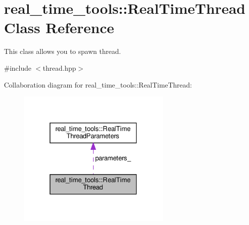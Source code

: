 \hypertarget{classreal__time__tools_1_1RealTimeThread}{}\section{real\+\_\+time\+\_\+tools\+:\+:Real\+Time\+Thread Class Reference}
\label{classreal__time__tools_1_1RealTimeThread}


This class allows you to spawn thread.  




{\ttfamily \#include $<$thread.\+hpp$>$}



Collaboration diagram for real\+\_\+time\+\_\+tools\+:\+:Real\+Time\+Thread\+:
\nopagebreak
\begin{figure}[H]
\begin{center}
\leavevmode
\includegraphics[width=211pt]{classreal__time__tools_1_1RealTimeThread__coll__graph}
\end{center}
\end{figure}
